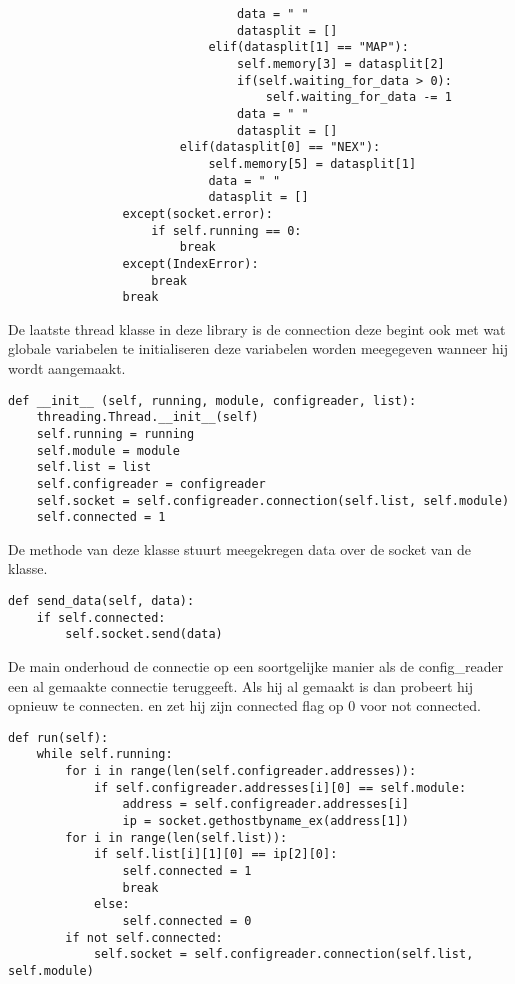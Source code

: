 \documentclass[a4paper,10pt]{article}
\begin{document}
\begin{verbatim}
                                data = " "
                                datasplit = []
                            elif(datasplit[1] == "MAP"):
                                self.memory[3] = datasplit[2]
                                if(self.waiting_for_data > 0):
                                    self.waiting_for_data -= 1
                                data = " "
                                datasplit = []
                        elif(datasplit[0] == "NEX"):
                            self.memory[5] = datasplit[1]
                            data = " "
                            datasplit = []                                    
                except(socket.error):
                    if self.running == 0:
                        break
                except(IndexError):
                    break
                break
\end{verbatim}
De laatste thread klasse in deze library is de connection deze begint ook met wat globale variabelen te initialiseren deze variabelen worden meegegeven wanneer hij wordt aangemaakt.
\begin{verbatim}
def __init__ (self, running, module, configreader, list):
    threading.Thread.__init__(self)
    self.running = running
    self.module = module
    self.list = list
    self.configreader = configreader
    self.socket = self.configreader.connection(self.list, self.module)
    self.connected = 1
\end{verbatim}
De methode van deze klasse stuurt meegekregen data over de socket van de klasse.
\begin{verbatim}
def send_data(self, data):
    if self.connected:
        self.socket.send(data)
\end{verbatim}
De main onderhoud de connectie op een soortgelijke manier als de config_reader een al gemaakte connectie teruggeeft. Als hij al gemaakt is dan probeert hij opnieuw te connecten. en zet hij zijn connected flag op 0 voor not connected.
\begin{verbatim}
def run(self):
    while self.running:
        for i in range(len(self.configreader.addresses)):
            if self.configreader.addresses[i][0] == self.module:
                address = self.configreader.addresses[i]
                ip = socket.gethostbyname_ex(address[1])
        for i in range(len(self.list)):
            if self.list[i][1][0] == ip[2][0]:
                self.connected = 1
                break
            else:
                self.connected = 0
        if not self.connected:
            self.socket = self.configreader.connection(self.list, self.module)
\end{verbatim}
\end{document}
